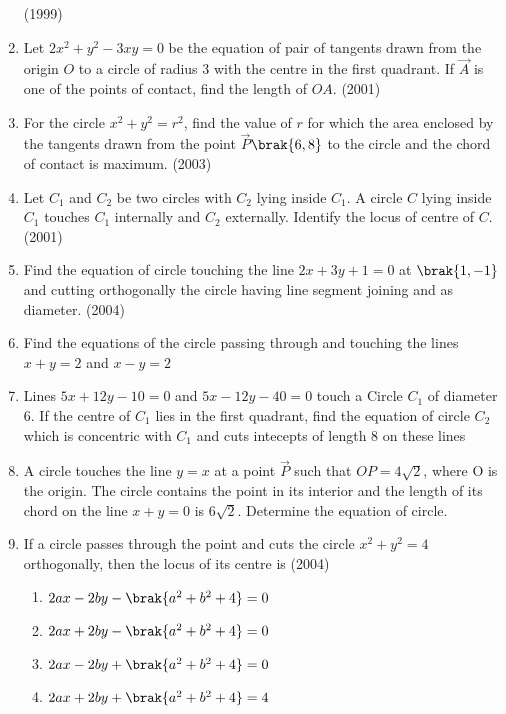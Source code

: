 \begin{enumerate}
                  \hfill(1999)
%
%
%
%
\item Let $2x^2+y^2-3xy=0$ be the equation of pair of tangents drawn from the origin $O$ to a circle of radius 3 with the centre in the first quadrant. If $\vec{A}$ is one of the points of contact,  find the length of $OA$.                   \hfill(2001)
%
%
%
\item For the circle $x^2+y^2=r^2$,  find the value of $r$ for which the area enclosed by the tangents drawn from the point $\vec{P}$$\brak{6, 8}$ to the circle and the chord of contact is maximum.
%
%
\hfill(2003) 
%
\item Let $C_{1}$ and $C_{2}$ be two circles with $C_{2}$ lying inside $C_{1}$. A circle $C$ lying inside $C_{1}$ touches $C_{1}$ internally and $C_{2}$ externally. Identify the locus of centre of $C$.                                \hfill(2001)
%
%
%
%
%
%
\item Find the equation of circle touching the line $2x+3y+1=0$ at $\brak{1, -1}$ and cutting orthogonally the circle having line segment joining  and  as diameter.
%
%
\hfill(2004)     
\item Find the equations of the circle passing through  and touching the lines $x+y=2$ and $x-y=2$
%
\hfill {}
\item Lines $5x+12y-10=0$ and $5x-12y-40=0$ touch a Circle $C_1$ of diameter 6. If the centre of $C_1$ lies in the first quadrant,  find the equation of circle $C_2$ which is concentric with $C_1$ and cuts intecepts of length 8 on these lines
%
\hfill {}
\item A circle touches the line $y=x$ at a point $\vec{P}$ such that $OP=4\sqrt{2}$,  where O is the origin. The circle contains the point  in its interior and the length of its chord on the line $x+y=0$ is $6\sqrt{2}$. Determine the equation of circle.
%
\hfill {}
\item If a circle passes through the point  and cuts the circle $x^2+y^2=4$ orthogonally,  then the locus of its centre is
\hfill{(2004)}
\begin{multicols}{2}
\begin{enumerate}
\item $2ax-2by-\brak{a^2+b^2+4}=0$
\item $2ax+2by-\brak{a^2+b^2+4}=0$
\item $2ax-2by+\brak{a^2+b^2+4}=0$
\item $2ax+2by+\brak{a^2+b^2+4}=4$
\end{enumerate}

\end{multicols}$$
\end{enumerate}
